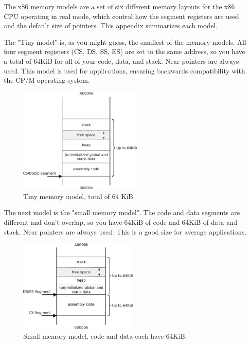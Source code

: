 \documentclass[book.tex]{subfiles}
\begin{document}
\label{appendix_memory_models}
The x86 memory models are a set of six different memory layouts for the x86 CPU operating in real mode, which control how the segment registers are used and the default size of pointers. This appendix summarizes each model.\\

\par
The "Tiny model" is, as you might guess, the smallest of the memory models. All
four segment registers (CS, DS, SS, ES) are set to the same address, so you have a total of 64KiB for all of your code, data, and stack. Near pointers are always used. This model is used for  applications, ensuring backwards compatibility with the CP/M operating system.\\
\begin{figure}[H]
\centering
\includegraphics[width=0.55\textwidth]{imgs/drawings/memory/tiny_mm.eps}
\caption{Tiny memory model, total of 64 KiB.}
\label{fig:mm_tiny}
\end{figure}

\pagebreak

The next model is the "small memory model". The code and data segments are different and don't overlap, so you have 64KiB of code and 64KiB of data and stack. Near pointers are
always used. This is a good size for average applications.\\
\begin{figure}[H]
\centering
\includegraphics[width=0.53\textwidth]{imgs/drawings/memory/small_mm_v2.eps}
\caption{Small memory model, code and data each have 64KiB.}
\label{fig:mm_small}
\end{figure}
\end{document}
